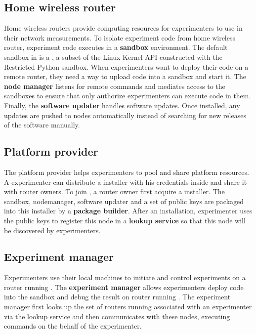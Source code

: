 \subsection{Home wireless router}
Home wireless routers provide computing resources for experimenters to use in their network measurements. To isolate experiment code from home wireless router, experiment code executes in a \textbf{sandbox} environment. The default sandbox in \sysname is a \sandboxname, a subset of the Linux Kernel API constructed with the Restricted Python sandbox. When experimenters want to deploy their code on a remote router, they need a way to upload code into a sandbox and start it. The \textbf{node manager} listens for remote commands and mediates access to the sandboxes to ensure that only authorize experimenters can execute code in them. Finally, the \textbf{software updater} handles software updates. Once installed, any updates are pushed to nodes automatically instead of searching for new releases of the software manually.  

\subsection{Platform provider}
The platform provider helps experimenters to pool and share platform resources. A experimenter can distribute a \sysname installer with his credentials inside and share it with router owners. To join \sysname, a router owner first acquire a \sysname installer. The sandbox, nodemanager, software updater and a set of public keys are packaged into this installer by a \textbf{package builder}. After an installation, experimenter uses the public keys to register this node in a \textbf{lookup service} so that this node will be discovered by experimenters.

\subsection{Experiment manager}
Experimenters use their local machines to initiate and control experiments on a router running \sysname. The \textbf{experiment manager} allows experimenters deploy code into the sandbox and debug the result on router running \sysname. The experiment manager first looks up the set of routers running \sysname associated with an experimenter via the lookup service and then communicates with these nodes, executing commands on the behalf of the experimenter.  

